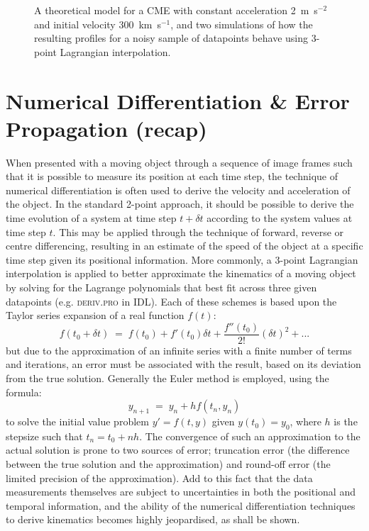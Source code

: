 \documentclass[structabstract]{aa}
\begin{document}
\begin{figure}[!ht]
\caption{A theoretical model for a CME with constant acceleration 2~m~s$^{-2}$ and initial velocity 300~km~s$^{-1}$, and two simulations of how the resulting profiles for a noisy sample of datapoints behave using 3-point Lagrangian interpolation.}
\label{sim_vels_thesis}
\end{figure}

\section{Numerical Differentiation \& Error Propagation (recap)}
When presented with a moving object through a sequence of image frames such that it is possible to measure its position at each time step, the technique of numerical differentiation is often used to derive the velocity and acceleration of the object. In the standard 2-point approach, it should be possible to derive the time evolution of a system at time step $t+\delta t$ according to the system values at time step $t$. This may be applied through the technique of forward, reverse or centre differencing, resulting in an estimate of the speed of the object at a specific time step given its positional information. More commonly, a 3-point Lagrangian interpolation is applied to better approximate the kinematics of a moving object by solving for the Lagrange polynomials that best fit across three given datapoints (e.g. \textsc{deriv.pro} in IDL). Each of these schemes is based upon the Taylor series expansion of a real function $f(t)$:
\begin{equation}
\label{taylor1}
f(t_0+\delta t) \; = \; f(t_0)+f'(t_0)\delta t +  \frac{f''(t_0)}{2!}(\delta t)^{2}  + ...
\end{equation}
but due to the approximation of an infinite series with a finite number of terms and iterations, an error must be associated with the result, based on its deviation from the true solution. Generally the Euler method is employed, using the formula:
\begin{equation}
y_{n+1} \; = \; y_n + h f(t_n, y_n)
\end{equation}
to solve the initial value problem $y'=f(t,y)$ given $y(t_0)=y_0$, where $h$ is the stepsize such that $t_n=t_0+nh$. The convergence of such an approximation to the actual solution is prone to two sources of error; truncation error (the difference between the true solution and the approximation) and round-off error (the limited precision of the approximation). Add to this fact that the data measurements themselves are subject to uncertainties in both the positional and temporal information, and the ability of the numerical differentiation techniques to derive kinematics becomes highly jeopardised, as shall be shown.
\end{document}
